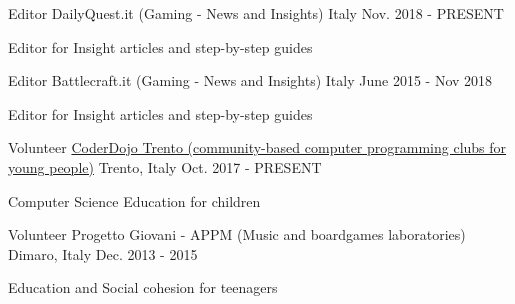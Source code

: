 

\begin{cventries}

  \cventry
    {Editor} %
    {DailyQuest.it (Gaming - News and Insights)} %
    {Italy} %
    {Nov. 2018 - PRESENT} %
    {
      \begin{cvitems} %
        \item {Editor for Insight articles and step-by-step guides}
      \end{cvitems}
    }

  \cventry
    {Editor} %
    {Battlecraft.it (Gaming - News and Insights)} %
    {Italy} %
    {June 2015 - Nov 2018} %
    {
      \begin{cvitems} %
        \item {Editor for Insight articles and step-by-step guides}
      \end{cvitems}
    }

  \cventry
    {Volunteer} %
    {\href{https://www.coderdojotrento.it/}{CoderDojo Trento (community-based computer programming clubs for young people)}} %
    {Trento, Italy} %
    {Oct. 2017 - PRESENT} %
    {
      \begin{cvitems} %
        \item {Computer Science Education for children}
      \end{cvitems}
    }

  \cventry
    {Volunteer} %
    {Progetto Giovani - APPM (Music and boardgames laboratories)} %
    {Dimaro, Italy} %
    {Dec. 2013 - 2015} %
    {
      \begin{cvitems} %
        \item {Education and Social cohesion for teenagers}
      \end{cvitems}
    }

\end{cventries}